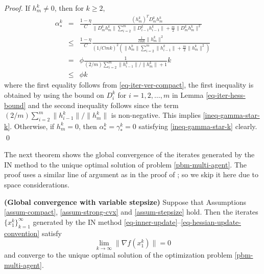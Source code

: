 \documentclass[final,numbook]{svjour3}
\begin{document}
\begin{proof} 
If $h_m^k \neq 0$, then for $k\geq 2$, 
\begin{eqnarray*}
  \alpha_*^k &=& \frac{1-\eta}{C} \frac{ (h_m^k)^T D_m^k h_m^k}{\|D_m^k h_m^k\| \sum_{i=2}^m \|D_{i-1}^k h_{i-1}^k\| + \frac{m}{2} \|D_m^k h_m^k\|^2}  \\
 
  &\leq& \frac{1-\eta}{C} \frac{\frac{1}{cmk} \|h_m^k\|^2}{(1/Cmk)^2 (\| h_m^k\| \sum_{i=2}^m \| h_{i-1}^k\| + \frac{m}{2} \| h_m^k\|^2) }  \\
  &=& \phi  \frac{1}{ (2/m)\sum_{i=2}^m \| h_{i-1}^k\|/\| h_m^k\| + 1} k \\
  &\leq& \phi  k
\end{eqnarray*}
where the first equality follows from \eqref{eq-iter-ver-compact}, the first inequality is obtained by using the bound on $D_i^k$ for $i=1,2,\dots,m$ in Lemma \ref{eq-iter-hess-bound} and the second inequality follows since the term $(2/m)\sum_{i=2}^m \| h_{i-1}^k\|/\| h_m^k\|$ is non-negative. This implies \eqref{ineq-gamma-star-k}. Otherwise, if $h_m^k = 0$, then $\alpha_*^k=\gamma_*^k = 0$ satisfying \eqref{ineq-gamma-star-k} clearly. \qed
\end{proof}

The next theorem shows the global convergence of the iterates generated by the IN method to the unique optimal solution of problem \eqref{pbm-multi-agent}. The proof uses a similar line of argument as in the proof of 
\cite[Theorem 4.1]{AlgEkfs2003}; so we skip it here due to space considerations. 
\begin{theorem}\textbf{(Global convergence with variable stepsize)}\label{thm-global-conv}
Suppose that Assumptions \ref{assum-compact}, \ref{assum-strong-cvx} and \ref{assum-stepsize} hold. Then the iterates $\{x_1^k\}_{k=1}^\infty$ generated by the IN method \eqref{eq-inner-update}--\eqref{eq-hessian-update-convention} satisfy 
$$ \lim_{k \to \infty} \| \nabla f (x_1^k)\| = 0 $$
and converge to the unique optimal solution of the optimization problem \eqref{pbm-multi-agent}. 
\end{theorem}
\end{document}
